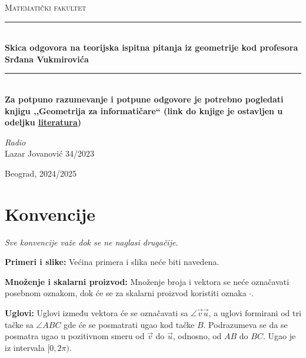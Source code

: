 \documentclass[12pt]{article}
\newcommand{\vek}[1]{\overrightarrow{#1}}
\begin{document}
\begin{titlepage}

    \newcommand{\HRule}{\rule{\linewidth}{0.4mm}}
    \center
    \textsc{\LARGE Matematički fakultet}\\[5cm]

    \HRule\\[0.4cm]
    {\LARGE\bfseries Skica odgovora na teorijska ispitna pitanja iz geometrije kod profesora
    Srđana Vukmirovića}
    \\[0.2cm]
    \HRule\\
    {\large\bfseries Za potpuno razumevanje i potpune odgovore je potrebno pogledati
    knjigu ,,Geometrija za informatičare`` (link do knjige je ostavljen u odeljku \hyperref[literatura]{literatura})}
    \\[0.2cm]

    \vspace{16\baselineskip}
    \begin{flushleft}
        \large
        \textit{Radio}\\
        Lazar Jovanović 34/2023
    \end{flushleft}

    \vfill\vfill\vfill\vfill
    {\large Beograd, 2024/2025}
    \vfill

\end{titlepage}

\tableofcontents
\newpage

\section{Konvencije}
\textit{Sve konvencije važe dok se ne naglasi drugačije.}
\par
\vspace*{1cm}

\textbf{Primeri i slike:} Većina primera i slika neće biti navedena.

\textbf{Množenje i skalarni proizvod:} Množenje broja i vektora se neće označavati posebnom
oznakom, dok će se za skalarni proizvod koristiti oznaka $\cdot$.
\par

\textbf{Uglovi:} Uglovi između vektora će se označavati sa
$\angle{\vek{v}\vek{u}}$, a uglovi formirani od tri tačke sa $\angle{ABC}$ gde
će se posmatrati ugao kod tačke $B$. Podrazumeva se da se posmatra ugao u
pozitivnom smeru od $\vek{v}$ do $\vek{u}$, odnosno, od $AB$ do $BC$. Ugao je
iz intervala $[0,2\pi)$.
\par
\end{document}
